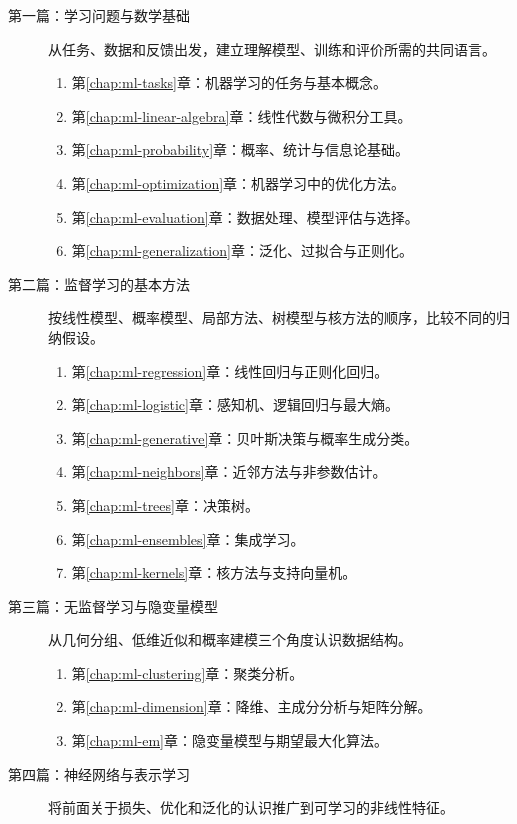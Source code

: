 \documentclass[UTF8,12pt,a4paper,fontset=fandol]{ctexbook}
\begin{document}
\begin{description}
  \item[第一篇：学习问题与数学基础]
  从任务、数据和反馈出发，建立理解模型、训练和评价所需的共同语言。
  \begin{enumerate}
    \item 第\ref{chap:ml-tasks}章：机器学习的任务与基本概念。
    \item 第\ref{chap:ml-linear-algebra}章：线性代数与微积分工具。
    \item 第\ref{chap:ml-probability}章：概率、统计与信息论基础。
    \item 第\ref{chap:ml-optimization}章：机器学习中的优化方法。
    \item 第\ref{chap:ml-evaluation}章：数据处理、模型评估与选择。
    \item 第\ref{chap:ml-generalization}章：泛化、过拟合与正则化。
  \end{enumerate}
  \item[第二篇：监督学习的基本方法]
  按线性模型、概率模型、局部方法、树模型与核方法的顺序，比较不同的归纳假设。
  \begin{enumerate}
    \item 第\ref{chap:ml-regression}章：线性回归与正则化回归。
    \item 第\ref{chap:ml-logistic}章：感知机、逻辑回归与最大熵。
    \item 第\ref{chap:ml-generative}章：贝叶斯决策与概率生成分类。
    \item 第\ref{chap:ml-neighbors}章：近邻方法与非参数估计。
    \item 第\ref{chap:ml-trees}章：决策树。
    \item 第\ref{chap:ml-ensembles}章：集成学习。
    \item 第\ref{chap:ml-kernels}章：核方法与支持向量机。
  \end{enumerate}
  \item[第三篇：无监督学习与隐变量模型]
  从几何分组、低维近似和概率建模三个角度认识数据结构。
  \begin{enumerate}
    \item 第\ref{chap:ml-clustering}章：聚类分析。
    \item 第\ref{chap:ml-dimension}章：降维、主成分分析与矩阵分解。
    \item 第\ref{chap:ml-em}章：隐变量模型与期望最大化算法。
  \end{enumerate}
  \item[第四篇：神经网络与表示学习]
  将前面关于损失、优化和泛化的认识推广到可学习的非线性特征。

\end{description}
\end{document}

